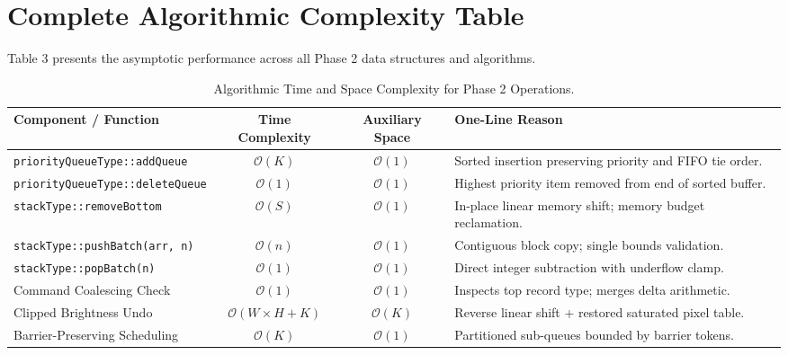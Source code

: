 \documentclass[10pt,a4paper]{article}
\begin{document}
\clearpage

\section{Complete Algorithmic Complexity Table}
Table 3 presents the asymptotic performance across all Phase 2 data structures and algorithms.

\begin{table}[h!]
\centering
\small
\begin{tabularx}{\textwidth}{l c c X}
\toprule
\textbf{Component / Function} & \textbf{Time Complexity} & \textbf{Auxiliary Space} & \textbf{One-Line Reason} \\
\midrule
\texttt{priorityQueueType::addQueue} & $\mathcal{O}(K)$ & $\mathcal{O}(1)$ & Sorted insertion preserving priority and FIFO tie order. \\
\texttt{priorityQueueType::deleteQueue} & $\mathcal{O}(1)$ & $\mathcal{O}(1)$ & Highest priority item removed from end of sorted buffer. \\
\texttt{stackType::removeBottom} & $\mathcal{O}(S)$ & $\mathcal{O}(1)$ & In-place linear memory shift; memory budget reclamation. \\
\texttt{stackType::pushBatch(arr, n)} & $\mathcal{O}(n)$ & $\mathcal{O}(1)$ & Contiguous block copy; single bounds validation. \\
\texttt{stackType::popBatch(n)} & $\mathcal{O}(1)$ & $\mathcal{O}(1)$ & Direct integer subtraction with underflow clamp. \\
Command Coalescing Check & $\mathcal{O}(1)$ & $\mathcal{O}(1)$ & Inspects top record type; merges delta arithmetic. \\
Clipped Brightness Undo & $\mathcal{O}(W \times H + K)$ & $\mathcal{O}(K)$ & Reverse linear shift + restored saturated pixel table. \\
Barrier-Preserving Scheduling & $\mathcal{O}(K)$ & $\mathcal{O}(1)$ & Partitioned sub-queues bounded by barrier tokens. \\
\bottomrule
\end{tabularx}
\caption{Algorithmic Time and Space Complexity for Phase 2 Operations.}
\end{table}
\end{document}
